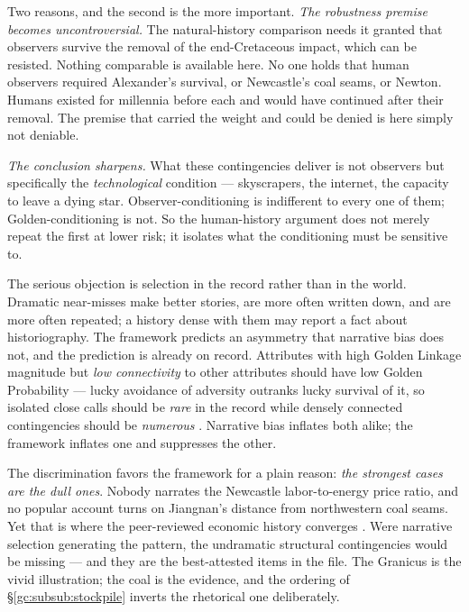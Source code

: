 Two reasons, and the second is the more important. \emph{The robustness premise becomes uncontroversial.} The natural-history
comparison needs it granted that observers survive the removal of the
end-Cretaceous impact, which can be resisted. Nothing comparable is
available here. No one holds that human observers required Alexander's
survival, or Newcastle's coal seams, or Newton. Humans existed for
millennia before each and would have continued after their removal. The
premise that carried the weight and could be denied is here simply not
deniable.

\emph{The conclusion sharpens.} What these contingencies deliver is not
observers but specifically the \emph{technological} condition ---
skyscrapers, the internet, the capacity to leave a dying star.
Observer-conditioning is indifferent to every one of them;
Golden-conditioning is not. So the human-history argument does not merely repeat
the first at lower risk; it isolates what the conditioning must be
sensitive to.

\begin{remark}\label{gc:rem:narrativebias}
The serious objection is selection in the record rather than in the
world. Dramatic near-misses make better stories, are more often written
down, and are more often repeated; a history dense with them may report
a fact about historiography. The framework predicts an asymmetry that narrative bias does not, and
the prediction is already on record. Attributes with high Golden Linkage
magnitude but \emph{low connectivity} to other attributes should have
low Golden Probability --- lucky avoidance of adversity outranks lucky
survival of it, so isolated close calls should be \emph{rare} in the
record while densely connected contingencies should be
\emph{numerous} \cite{GoldenScience2022}. Narrative bias inflates both
alike; the framework inflates one and suppresses the other.

The discrimination favors the framework for a plain reason: \emph{the strongest cases are the dull ones}. Nobody narrates
the Newcastle labor-to-energy price ratio, and no popular account turns
on Jiangnan's distance from northwestern coal seams. Yet that is where
the peer-reviewed economic history converges \cite{Pomeranz00,Allen09}. Were narrative selection generating the pattern, the
undramatic structural contingencies would be missing --- and they are
the best-attested items in the file. The Granicus is the vivid
illustration; the coal is the evidence, and the ordering of
\S\ref{gc:subsub:stockpile} inverts the rhetorical one deliberately.
\end{remark}



